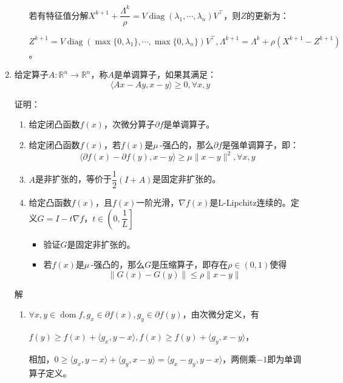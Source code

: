 \documentclass[cn,hazy,cyan,11pt,normal]{elegantnote}
\DeclareMathOperator*{\diag}{diag}
\DeclareMathOperator*{\dom}{dom}
\begin{document}
\begin{enumerate}
\begin{enumerate}
                若有特征值分解$X^{k+1}+\dfrac{\Lambda^k}{\rho}=V\diag(\lambda_1,\cdots,\lambda_n)V^{\top}$，则$Z$的更新为：

                $Z^{k+1}=V\diag(\max\{0,\lambda_1\},\cdots,\max\{0,\lambda_n\})V^{\top},\Lambda^{k+1}=\Lambda^k+\rho(X^{k+1}-Z^{k+1})$。\vspace{0.5cm}

            \end{enumerate}

        \item {\color{c1}给定算子$A:\mathbb{R}^n\rightarrow\mathbb{R}^n$，称$A$是单调算子，如果其满足：\[\langle Ax-Ay,x-y \rangle\geq 0,\forall x,y\]

            证明：

            \begin{enumerate}
                \item 给定闭凸函数$f(x)$，次微分算子$\partial f$是单调算子。
                \item 给定闭凸函数$f(x)$，若$f(x)$是$\mu\,$-强凸的，那么$\partial f$是强单调算子，即：\[\langle \partial f(x)-\partial f(y),x-y \rangle\geq \mu\|x-y\|^2,\forall x,y\]
                \item $A$是非扩张的，等价于$\dfrac12(I+A)$是固定非扩张的。
                \item 给定凸函数$f(x)$，且$f(x)$一阶光滑，$\nabla f(x)$是L-Lipchitz连续的。定义$G=I-t\nabla f$，$t\in\left(0,\dfrac1L\right]$
                    \begin{itemize}
                        \item 验证$G$是固定非扩张的。
                        \item 若$f(x)$是$\mu\,$-强凸的，那么$G$是压缩算子，即存在$\rho\in(0,1)$使得\[\|G(x)-G(y)\|\leq\rho\|x-y\|\]
                    \end{itemize}
            \end{enumerate}}


            \vspace{0.5cm}\textcolor{c2}{解}

            \begin{enumerate}
                \item $\forall x,y\in\dom f,g_x\in\partial f(x),g_y\in\partial f(y)$，由次微分定义，有

                    $f(y)\geq f(x)+\langle g_x,y-x \rangle,f(x)\geq f(y)+\langle g_y,x-y \rangle$，

                    相加，$0\geq \langle g_x,y-x \rangle+\langle g_y,x-y \rangle=\langle g_x-g_y,y-x \rangle$，两侧乘$-1$即为单调算子定义。\vspace{0.55cm}


\end{enumerate}
\end{enumerate}
\end{document}
